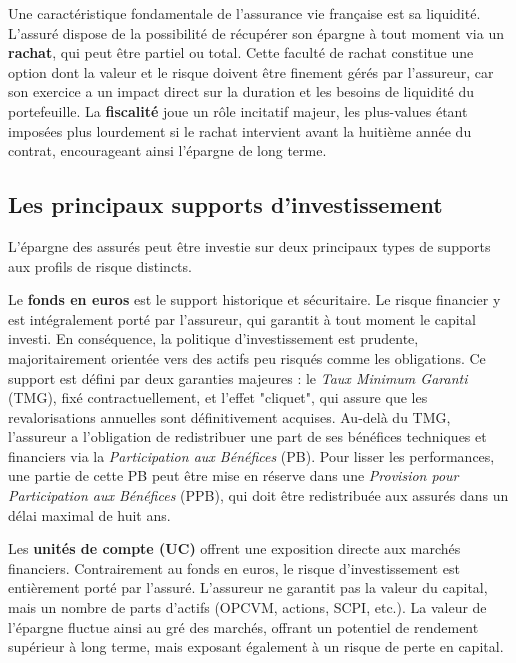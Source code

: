 \bigskip

Une caractéristique fondamentale de l'assurance vie française est sa liquidité. L'assuré dispose de la possibilité de récupérer son épargne à tout moment via un \textbf{rachat}, qui peut être partiel ou total. Cette faculté de rachat constitue une option dont la valeur et le risque doivent être finement gérés par l'assureur, car son exercice a un impact direct sur la duration et les besoins de liquidité du portefeuille. La \textbf{fiscalité} joue un rôle incitatif majeur, les plus-values étant imposées plus lourdement si le rachat intervient avant la huitième année du contrat, encourageant ainsi l'épargne de long terme.

\subsection{Les principaux supports d'investissement}

L'épargne des assurés peut être investie sur deux principaux types de supports aux profils de risque distincts.

\bigskip

Le \textbf{fonds en euros} est le support historique et sécuritaire. Le risque financier y est intégralement porté par l'assureur, qui garantit à tout moment le capital investi. En conséquence, la politique d'investissement est prudente, majoritairement orientée vers des actifs peu risqués comme les obligations. Ce support est défini par deux garanties majeures : le \textit{Taux Minimum Garanti} (TMG), fixé contractuellement, et l'effet "cliquet", qui assure que les revalorisations annuelles sont définitivement acquises. Au-delà du TMG, l'assureur a l'obligation de redistribuer une part de ses bénéfices techniques et financiers via la \textit{Participation aux Bénéfices} (PB). Pour lisser les performances, une partie de cette PB peut être mise en réserve dans une \textit{Provision pour Participation aux Bénéfices} (PPB), qui doit être redistribuée aux assurés dans un délai maximal de huit ans.

\bigskip

Les \textbf{unités de compte (UC)} offrent une exposition directe aux marchés financiers. Contrairement au fonds en euros, le risque d'investissement est entièrement porté par l'assuré. L'assureur ne garantit pas la valeur du capital, mais un nombre de parts d'actifs (OPCVM, actions, SCPI, etc.). La valeur de l'épargne fluctue ainsi au gré des marchés, offrant un potentiel de rendement supérieur à long terme, mais exposant également à un risque de perte en capital.


